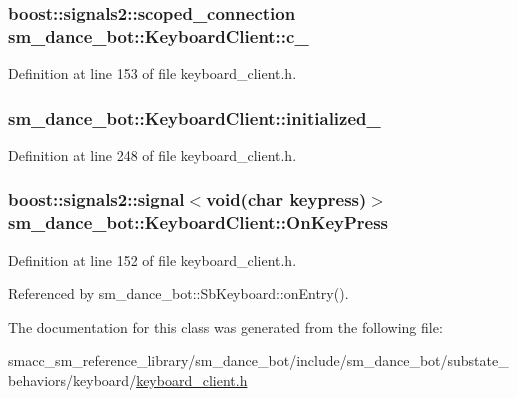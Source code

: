 \subsubsection[{\texorpdfstring{c\+\_\+}{c_}}]{\setlength{\rightskip}{0pt plus 5cm}boost\+::signals2\+::scoped\+\_\+connection sm\+\_\+dance\+\_\+bot\+::\+Keyboard\+Client\+::c\+\_\+}\hypertarget{classsm__dance__bot_1_1KeyboardClient_a7d49553efd214743c433e4b1a8c11aee}{}\label{classsm__dance__bot_1_1KeyboardClient_a7d49553efd214743c433e4b1a8c11aee}


Definition at line 153 of file keyboard\+\_\+client.\+h.

\subsubsection[{\texorpdfstring{initialized\+\_\+}{initialized_}}]{ sm\+\_\+dance\+\_\+bot\+::\+Keyboard\+Client\+::initialized\+\_\+\hspace{0.3cm}{\ttfamily [private]}}\hypertarget{classsm__dance__bot_1_1KeyboardClient_a5bf3d8cf45c2915661b5218af8432206}{}\label{classsm__dance__bot_1_1KeyboardClient_a5bf3d8cf45c2915661b5218af8432206}


Definition at line 248 of file keyboard\+\_\+client.\+h.

\subsubsection[{\texorpdfstring{On\+Key\+Press}{OnKeyPress}}]{\setlength{\rightskip}{0pt plus 5cm}boost\+::signals2\+::signal$<$void(char keypress)$>$ sm\+\_\+dance\+\_\+bot\+::\+Keyboard\+Client\+::\+On\+Key\+Press}\hypertarget{classsm__dance__bot_1_1KeyboardClient_aeaf2f85801120bd76adfd6455650dc03}{}\label{classsm__dance__bot_1_1KeyboardClient_aeaf2f85801120bd76adfd6455650dc03}


Definition at line 152 of file keyboard\+\_\+client.\+h.



Referenced by sm\+\_\+dance\+\_\+bot\+::\+Sb\+Keyboard\+::on\+Entry().



The documentation for this class was generated from the following file\+:\begin{DoxyCompactItemize}
\item 
smacc\+\_\+sm\+\_\+reference\+\_\+library/sm\+\_\+dance\+\_\+bot/include/sm\+\_\+dance\+\_\+bot/substate\+\_\+behaviors/keyboard/\hyperlink{keyboard__client_8h}{keyboard\+\_\+client.\+h}\end{DoxyCompactItemize}
